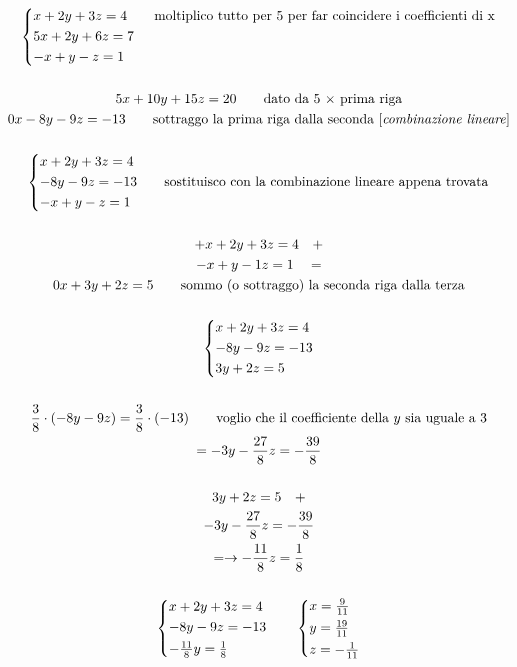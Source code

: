 \documentclass[italian]{article}
\begin{document}
\begin{gather*}
	\begin{cases*}
		x+2y+3z=4 \qquad \text{moltiplico tutto per 5 per far coincidere i coefficienti di x} \\
		5x+2y+6z=7\\
		-x+y-z=1
	\end{cases*}\\\\
	5x + 10y + 15z=20 \qquad \text{dato da 5 $\times$ prima riga}\\
	0x -8y -9z = -13 \qquad \text{sottraggo la prima riga dalla seconda [\textit{combinazione lineare}]}\\\\
	\begin{cases*}
		x+2y+3z=4\\
		-8y-9z=-13 \qquad \text{sostituisco con la combinazione lineare appena trovata}\\
		-x+y-z=1
	\end{cases*}\\\\
	+x+2y+3z=4 \quad +\\
	-x + y -1z=1 \quad =\\
	0x + 3y + 2z =5 \qquad \text{sommo (o sottraggo) la seconda riga dalla terza}\\\\
	\begin{cases*}
		x+2y +3z=4\\
		-8y-9z=-13\\
		3y+2z=5
	\end{cases*}\\\\
	\frac{3}{8}\cdot (-8y-9z)=\frac{3}{8}\cdot (-13) \qquad \text{voglio che il coefficiente della $y$ sia uguale a 3}\\
	= -3y -\frac{27}{8}z = -\frac{39}{8}\\\\
	3y+2z=5 \quad + \\
	-3y -\frac{27}{8}z = -\frac{39}{8} \\ 
	= \to -\frac{11}{8}z = \frac{1}{8}\\\\
	\begin{cases*}
		x+2y+3z=4\\
		-8y-9z=-13\\
		-\frac{11}{8}y=\frac{1}{8}
	\end{cases*}
	\qquad
	\begin{cases*}
		x = \frac{9}{11}\\
		y = \frac{19}{11} \\
		z=-\frac{1}{11}
	\end{cases*}
\end{gather*}
\end{document}
